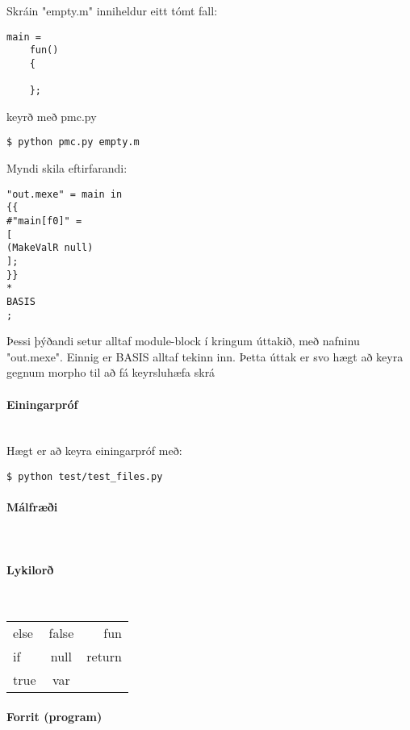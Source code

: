 \documentclass{article}
\begin{document}
Skráin "empty.m" inniheldur eitt tómt fall:
\begin{verbatim}
main = 
	fun()
	{
		
	};
\end{verbatim}

keyrð með pmc.py
\begin{verbatim}
$ python pmc.py empty.m
\end{verbatim}

Myndi skila eftirfarandi:

\begin{verbatim}
"out.mexe" = main in
{{
#"main[f0]" =
[
(MakeValR null)
];
}}
*
BASIS
;
\end{verbatim}

Þessi þýðandi setur alltaf module-block í kringum úttakið, með nafninu "out.mexe". Einnig er BASIS alltaf tekinn inn. 
Þetta úttak er svo hægt að keyra gegnum morpho til að fá keyrsluhæfa skrá

\paragraph{Einingarpróf} ~\\

Hægt er að keyra einingarpróf með:
\begin{verbatim}
$ python test/test_files.py
\end{verbatim}

\clearpage
\paragraph{{\Large Málfræði}} ~\\

\paragraph{Lykilorð} ~\\
\begin{tabular}{ l c r }
  \hline
  else & false & fun \\     
  if   & null  & return \\   
  true & var \\   
  \hline
\end{tabular}

\paragraph{Forrit (program)} ~\\
\end{document}
